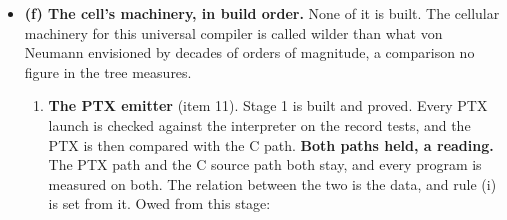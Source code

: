 \begin{enumerate}
\begin{itemize}
\begin{itemize}
\item \textbf{More basic questions, a reading.} When a question kills the process, the next question has to be more basic and asked from a fresh process. The cell that watches the probes, and the limit on what it knows, are posit 12 (\hyperref[chap:wants]{wants.md}).
\end{itemize}
\item \textbf{(f) The cell's machinery, in build order.} None of it is built. The cellular machinery for this universal compiler is called wilder than what von Neumann envisioned by decades of orders of magnitude, a comparison no figure in the tree measures.

\begin{enumerate}
\item \textbf{The PTX emitter} (item 11). Stage 1 is built and proved. Every PTX launch is checked against the interpreter on the record tests, and the PTX is then compared with the C path. \textbf{Both paths held, a reading.} The PTX path and the C source path both stay, and every program is measured on both. The relation between the two is the data, and rule (i) is set from it. Owed from this stage:


\end{enumerate}
\end{itemize}
\end{enumerate}
